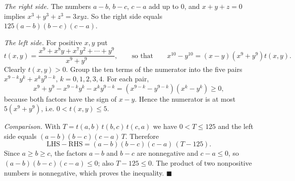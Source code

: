 \emph{The right side.} The numbers $a-b$, $b-c$, $c-a$ add up to $0$, and $x+y+z=0$ implies $x^3+y^3+z^3=3xyz$. So the right side equals $125(a-b)(b-c)(c-a)$.

\emph{The left side.} For positive $x,y$ put
\[t(x,y)=\dfrac{x^9+x^8y+x^7y^2+\cdots+y^9}{x^9+y^9},\qquad\text{so that}\qquad x^{10}-y^{10}=(x-y)\left(x^9+y^9\right)t(x,y).\]
Clearly $t(x,y)>0$. Group the ten terms of the numerator into the five pairs $x^{9-k}y^k+x^ky^{9-k}$, $k=0,1,2,3,4$. For each pair,
\[x^9+y^9-x^{9-k}y^k-x^ky^{9-k}=\left(x^{9-k}-y^{9-k}\right)\left(x^k-y^k\right)\ge0,\]
because both factors have the sign of $x-y$. Hence the numerator is at most $5\left(x^9+y^9\right)$, i.e. $0<t(x,y)\le5$.

\emph{Comparison.} With $T=t(a,b)\,t(b,c)\,t(c,a)$ we have $0<T\le125$ and the left side equals $(a-b)(b-c)(c-a)\,T$. Therefore
\[\text{LHS}-\text{RHS}=(a-b)(b-c)(c-a)\,(T-125).\]
Since $a\ge b\ge c$, the factors $a-b$ and $b-c$ are nonnegative and $c-a\le0$, so $(a-b)(b-c)(c-a)\le0$; also $T-125\le0$. The product of two nonpositive numbers is nonnegative, which proves the inequality. $\blacksquare$
